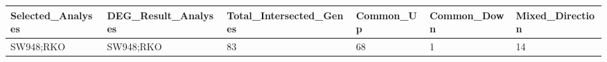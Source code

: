 \begingroup
\tiny
\setlength{\tabcolsep}{2pt}
\renewcommand{\arraystretch}{1.18}
\begin{tabular}{@{}llllll@{}}
\toprule
Selected\_Analyses & DEG\_Result\_Analyses & Total\_Intersected\_Genes & Common\_Up & Common\_Down & Mixed\_Direction \\
\midrule
SW948;RKO & SW948;RKO & 83 & 68 & 1 & 14 \\
\bottomrule
\end{tabular}
\endgroup
